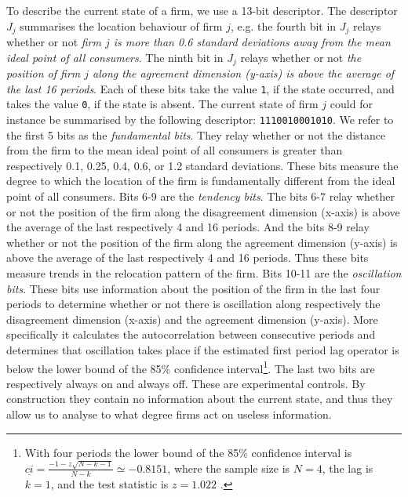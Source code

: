 \documentclass[preprint, 12pt]{elsarticle}
\begin{document}
To describe the current state of a firm, we use a 13-bit descriptor. The descriptor $J_j$ summarises the location behaviour of firm $j$, e.g. the fourth bit in $J_j$ relays whether or not \emph{firm $j$ is more than 0.6 standard deviations away from the mean ideal point of all consumers}. The ninth bit in $J_j$ relays whether or not \emph{the position of firm $j$ along the agreement dimension (y-axis) is above the average of the last 16 periods}. Each of these bits take the value \texttt{1}, if the state occurred, and takes the value \texttt{0}, if the state is absent. The current state of firm $j$ could for instance be summarised by the following descriptor: \texttt{1110010001010}. We refer to the first 5 bits as the \emph{fundamental bits}. They relay whether or not the distance from the firm to the mean ideal point of all consumers is greater than respectively 0.1, 0.25, 0.4, 0.6, or 1.2 standard deviations. These bits measure the degree to which the location of the firm is fundamentally different from the ideal point of all consumers. Bits 6-9 are the \emph{tendency bits}. The bits 6-7 relay whether or not the position of the firm along the disagreement dimension (x-axis) is above the average of the last respectively 4 and 16 periods. And the bits 8-9 relay whether or not the position of the firm along the agreement dimension (y-axis) is above the average of the last respectively 4 and 16 periods. Thus these bits measure trends in the relocation pattern of the firm. Bits 10-11 are the \emph{oscillation bits}. These bits use information about the position of the firm in the last four periods to determine whether or not there is oscillation along respectively the disagreement dimension (x-axis) and the agreement dimension (y-axis). More specifically it calculates the autocorrelation between consecutive periods and determines that oscillation takes place if the estimated first period lag operator is below the lower bound of the 85\% confidence interval\footnote{With four periods the lower bound of the 85\% confidence interval is $\underline{ci} = \frac{-1 - z \sqrt{N-k-1}}{N-k} \simeq -0.8151$, where the sample size is $N = 4$, the lag is $k=1$, and the test statistic is $z = 1.022$ \citep{Meko_2015, Chatfield_2016}.}. The last two bits are respectively always on and always off. These are experimental controls. By construction they contain no information about the current state, and thus they allow us to analyse to what degree firms act on useless information. 
\end{document}
